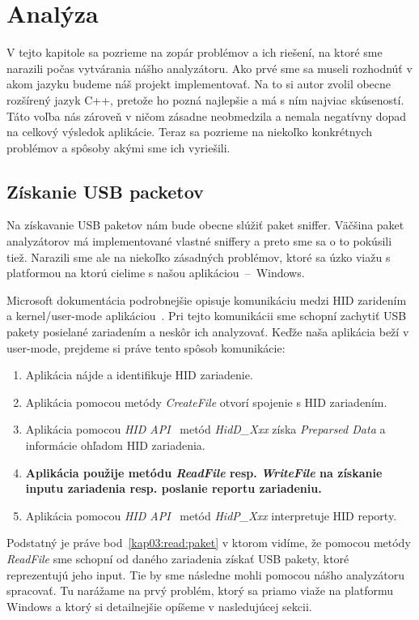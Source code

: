 \chapter{Analýza}
V tejto kapitole sa pozrieme na zopár problémov a ich riešení, na ktoré sme narazili počas vytvárania nášho analyzátoru.
Ako prvé sme sa museli rozhodnúť v akom jazyku budeme náš projekt implementovať. Na to si autor zvolil obecne rozšírený jazyk C++, pretože ho pozná najlepšie a má s ním najviac skúseností. Táto voľba nás zároveň v ničom zásadne neobmedzila a nemala negatívny dopad na celkový výsledok aplikácie. Teraz sa pozrieme na niekoľko konkrétnych problémov a spôsoby akými sme ich vyriešili.

\section{Získanie USB packetov}
Na získavanie USB paketov nám bude obecne slúžiť paket sniffer. Väčšina paket analyzátorov má implementované vlastné sniffery a preto sme sa o to pokúsili tiež. Narazili sme ale na niekoľko zásadných problémov, ktoré sa úzko viažu s platformou na ktorú cielime s našou aplikáciou~--~Windows.

Microsoft dokumentácia podrobnejšie opisuje komunikáciu medzi HID zaridením a kernel/user-mode aplikáciou~\cite{hid_opening_collections}. Pri tejto komunikácii sme schopní zachytiť USB pakety posielané zariadením a neskôr ich analyzovať. Keďže naša aplikácia beží v user-mode, prejdeme si práve tento spôsob komunikácie:
\begin{enumerate}
\item Aplikácia nájde a identifikuje HID zariadenie.
\item Aplikácia pomocou metódy \textit{CreateFile} otvorí spojenie s HID zariadením.
\item Aplikácia pomocou \textit{HID API}~\cite{hid_api} metód \textit{HidD\_Xxx} získa \textit{Preparsed Data} a informácie ohľadom HID zariadenia.
\item \label{kap03:read:paket} \textbf{Aplikácia použije metódu \textit{ReadFile} resp. \textit{WriteFile} na získanie inputu zariadenia resp. poslanie reportu zariadeniu.}
\item Aplikácia pomocou \textit{HID API}~\cite{hid_api} metód \textit{HidP\_Xxx} interpretuje HID reporty.
\end{enumerate}

Podstatný je práve bod~\ref{kap03:read:paket} v ktorom vidíme, že pomocou metódy \textit{ReadFile} sme schopní od daného zariadenia získať USB pakety, ktoré reprezentujú jeho input. Tie by sme následne mohli pomocou nášho analyzátoru spracovať. Tu narážame na prvý problém, ktorý sa priamo viaže na platformu Windows a ktorý si detailnejšie opíšeme v nasledujúcej sekcii.

